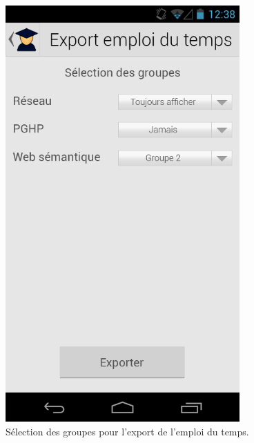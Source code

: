 \documentclass [pdftex,12pt] {report}
\begin{document}
\begin{figure}
\begin{minipage}[t]{8cm}
    \includegraphics[width=0.8\textwidth]{resources/ui_preview/10}
    \caption{Sélection des groupes pour l'export de l'emploi du temps.}
    \label{fig:10}
  \end{minipage}
  \hspace{-60pt}
\end{figure}



\end{document}
